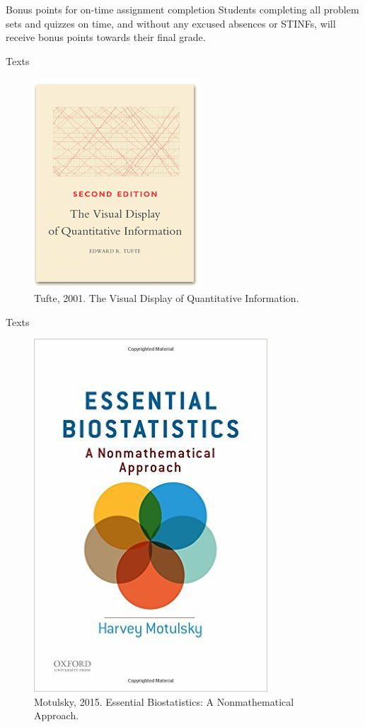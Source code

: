 \documentclass[presentation]{beamer}
\begin{document}
\begin{frame}[label={sec:orgheadline11}]{Bonus points for on-time assignment completion}
Students completing all problem sets and quizzes on time, and without any excused absences or STINFs, will receive bonus points towards their final grade.
\end{frame}


\begin{frame}[label={sec:orgheadline12}]{Texts}
\begin{figure}[htb]
\centering
\includegraphics[height=0.75\textheight]{./tufte-cover.png}
\caption{Tufte, 2001. The Visual Display of Quantitative Information.}
\end{figure}
\end{frame}


\begin{frame}[label={sec:orgheadline13}]{Texts}
\begin{figure}[htb]
\centering
\includegraphics[height=0.75\textheight]{./motulsky-cover.jpg}
\caption{Motulsky, 2015. Essential Biostatistics: A Nonmathematical Approach.}
\end{figure}
\end{frame}
\end{document}
